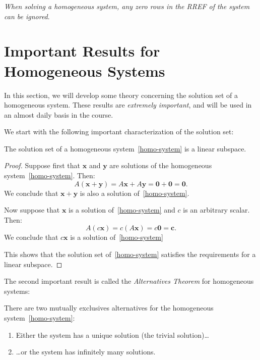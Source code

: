 \documentclass[12pt]{article}
\begin{document}
\begin{center}
\emph{When solving a homogeneous system, any zero rows in the RREF of the system can be ignored}.
\end{center}

\section{Important Results for Homogeneous Systems}
In this section, we will develop some theory concerning the solution set of a homogeneous system. These results are \emph{extremely important}, and will be used in an almost daily basis in the course.

We start with the following important characterization of the solution set:

\begin{theorem}
\label{theorem-homo-system-span}
The solution set of a homogeneous system~\ref{homo-system} is a linear subspace.
\end{theorem}
\begin{proof} Suppose first that $\mathbf{x}$ and $\mathbf{y}$ are solutions of the homogeneous system~\ref{homo-system}. Then:
\[
A(\mathbf{x}+\mathbf{y})=A\mathbf{x}+A\mathbf{y}=\mathbf{0}+\mathbf{0}=\mathbf{0}.
\]
We conclude that $\mathbf{x}+\mathbf{y}$ is also a solution of~\ref{homo-system}.

Now suppose that $\mathbf{x}$ is a solution of~\ref{homo-system} and $c$ is an arbitrary scalar. Then:
\[
A(c\mathbf{x})=c(A\mathbf{x})=c\mathbf{0}=\mathbf{c}.
\]
We conclude that $c\mathbf{x}$ is a solution of~\ref{homo-system}

This shows that the solution set of~\ref{homo-system} satisfies the requirements for a linear subspace.
\end{proof}

The second important result is called the \emph{Alternatives Theorem} for homogeneous systems:

\begin{theorem} There are two mutually exclusives alternatives for the homogeneous system~\ref{homo-system}:

\begin{enumerate}
\item Either the system has a unique solution (the trivial solution)\dots
\item \dots or the system has infinitely many solutions.
\end{enumerate}
\end{theorem}
\end{document}
